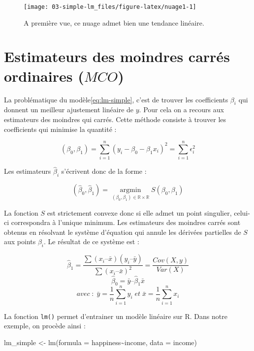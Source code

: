\documentclass[
]{book}
\newenvironment{Shaded}{\begin{snugshade}}{\end{snugshade}}
\newcommand{\AttributeTok}[1]{\textcolor[rgb]{0.77,0.63,0.00}{#1}}
\newcommand{\FunctionTok}[1]{\textcolor[rgb]{0.00,0.00,0.00}{#1}}
\newcommand{\NormalTok}[1]{#1}
\newcommand{\OtherTok}[1]{\textcolor[rgb]{0.56,0.35,0.01}{#1}}
\newcommand{\SpecialCharTok}[1]{\textcolor[rgb]{0.00,0.00,0.00}{#1}}
\begin{document}
\begin{figure}

{\centering \texttt{[image: 03-simple-lm\_files/figure-latex/nuage1-1]} 

}

\caption{A première vue, ce nuage admet bien une tendance linéaire.}\label{fig:nuage1}
\end{figure}

\hypertarget{OLS}{%
\section{\texorpdfstring{Estimateurs des moindres carrés ordinaires (\(MCO\))}{Estimateurs des moindres carrés ordinaires (MCO)}}\label{OLS}}

La problématique du modèle\eqref{eq:lm-simple}, c'est de trouver les
coefficients \(\beta_i\) qui donnent un meilleur ajustement linéaire de
\(y\). Pour cela on a recours aux estimateurs des moindres qui carrés.
Cette méthode consiste à trouver les coefficients qui minimise la
quantité :

\begin{equation}

(\beta_0,\beta_1) = \sum\limits^{n}_{i=1}(y_i -\beta_0-\beta_1 x_i)^2=\sum\limits^{n}_{i=1}\epsilon_i^2
\label{eq:OLS}

\end{equation}

Les estimateurs \(\hat{\beta}_i\) s'écrivent donc de la forme :

\[(\hat\beta_0,\hat\beta_1) =\operatorname*{argmin}_{(\beta_0,\beta_1)\in \mathbb{R}\times\mathbb{R}}S(\beta_0,\beta_1)\]

La fonction \(S\) est strictement convexe donc si elle admet un point
singulier, celui-ci correspondra à l'unique minimum. Les estimateurs des
moindres carrés sont obtenus en résolvant le système d'équation qui
annule les dérivées partielles de \(S\) aux points \(\beta_i\). Le résultat
de ce système est :

\[\hat{\beta}_1 = \frac{\sum(x_i – \bar{x}) (y_i – \bar{y})} {\sum(x_i – \bar{x})^2} = \frac{Cov(X,y)}{Var(X)}\]
\[\hat{\beta}_0 = \bar{y} – \hat{\beta}_1 \bar{x}\]
\[avec\; :\; \bar{y} = \frac{1}{n}\sum\limits_{i=1}^n y_i\; et\; \bar{x} = \frac{1}{n}\sum\limits_{i=1}^n x_i \]

La fonction \texttt{lm()} permet d'entrainer un modèle linéaire sur R. Dans
notre exemple, on procède ainsi :

\begin{Shaded}
\begin{Highlighting}[]
\NormalTok{lm\_simple }\OtherTok{\textless{}{-}} \FunctionTok{lm}\NormalTok{(}\AttributeTok{formula =}\NormalTok{ happiness}\SpecialCharTok{\textasciitilde{}}\NormalTok{income, }\AttributeTok{data =}\NormalTok{ income)}
\end{Highlighting}
\end{Shaded}
\end{document}
